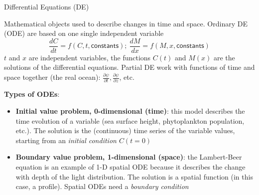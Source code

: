 \documentclass[english,aspectratio=169]{beamer}
\begin{document}
\begin{frame}{Differential Equations (DE)}
\begin{definition}
\small{Mathematical objects used to describe changes in time and
space. Ordinary DE (ODE) are based on one single independent variable
\[
\frac{dC}{dt}=f\left(C,t,\mathsf{constants}\right);\ \frac{dM}{dx}=f\left(M,x,\mathsf{constants}\right)
\]
$t$ and $x$ are independent variables, the functions
$C(t)$ and $M(x)$ are the solutions of the differential equations. Partial DE work with functions of time and space together (the real ocean): $\frac{\partial \psi}{\partial t},\frac{\partial \psi}{\partial z}$, etc.}

\scriptsize{
\textbf{Types of ODEs}:
\begin{itemize}
\item \textbf{Initial value problem, 0-dimensional (time)}:
this model describes the time evolution of a variable (sea surface
height, phytoplankton population, etc.). The solution is the (continuous)
time series of the variable values, starting from an \emph{initial
condition $C(t=0)$}
\item \textbf{Boundary value problem, 1-dimensional (space)}:
the Lambert-Beer equation is an example of 1-D spatial ODE because
it describes the change with depth of the light distribution. The
solution is a spatial function (in this case, a profile). Spatial ODEs
need a \emph{boundary condition}
\end{itemize}
}
\end{definition}

\end{frame}
\end{document}
